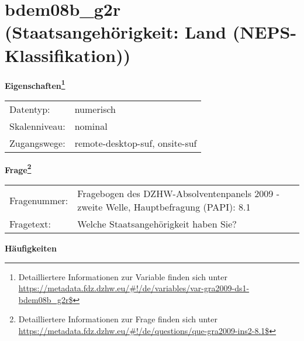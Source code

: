 
    \setcounter{footnote}{0}

    \vspace*{-1.8cm}
	\section{bdem08b\_g2r (Staatsangehörigkeit: Land (NEPS-Klassifikation))}
	\label{section:bdem08b_g2r}



    \vspace*{0.5cm}
    \noindent\textbf{Eigenschaften\footnote{Detailliertere Informationen zur Variable finden sich unter
		\url{https://metadata.fdz.dzhw.eu/\#!/de/variables/var-gra2009-ds1-bdem08b_g2r$}}}\\
	\begin{tabularx}{\hsize}{@{}lX}
	Datentyp: & numerisch \\
	Skalenniveau: & nominal \\
	Zugangswege: &
	  remote-desktop-suf, 
	  onsite-suf
 \\
    \end{tabularx}



				\vspace*{0.5cm}
                \noindent\textbf{Frage\footnote{Detailliertere Informationen zur Frage finden sich unter
		              \url{https://metadata.fdz.dzhw.eu/\#!/de/questions/que-gra2009-ins2-8.1$}}}\\
				\begin{tabularx}{\hsize}{@{}lX}
					Fragenummer: &
					  Fragebogen des DZHW-Absolventenpanels 2009 - zweite Welle, Hauptbefragung (PAPI):
					  8.1
 \\
					Fragetext: & Welche Staatsangehörigkeit haben Sie? \\
				\end{tabularx}





        		\vspace*{0.5cm}
                \noindent\textbf{Häufigkeiten}

